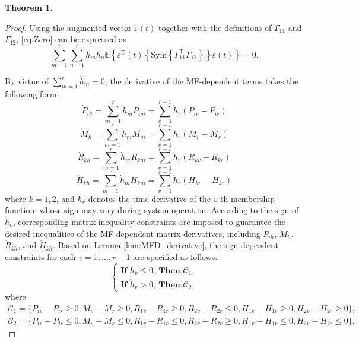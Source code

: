 \documentclass[preprint,review,fleqn,sort&compress,3p]{elsarticle}
\theoremstyle{definition} %
\theoremstyle{definition}%
\newtheorem{thm}{Theorem}[section]
\begin{document}
\begin{thm}
\begin{proof}
Using the augmented vector $\varepsilon(t)$ together with the definitions of $\Gamma_{11}$ and $\Gamma_{12}$, \eqref{eq:Zero} can be expressed as
\begin{equation} \label{eq:compact_VEQ}
	\sum_{m=1}^{r} \sum_{n=1}^{r} h_m h_n
	\mathbb{E} \left\lbrace 
	\varepsilon^{\mathrm{T}}(t) 
	\left\lbrace 
	\mathrm{Sym} \left\{ 
	\Gamma_{11}^{\mathrm{T}} \Gamma_{12}
	\right\} 
	\right\rbrace 
	\varepsilon(t)
	\right\rbrace 
	= 0.
\end{equation}

By virtue of $\sum_{m=1}^{r}\dot{h}_m=0$, the derivative of the MF-dependent terms takes the following form:
\begin{equation}
\dot{P}_{ih} = \sum_{m=1}^{r} \dot{h}_m P_{im} = \sum_{v=1}^{r-1} \dot{h}_v (P_{iv} - P_{ir})
\end{equation}
\begin{equation}
	\dot{M}_{h} = \sum_{m=1}^{r} \dot{h}_m M_{m} = \sum_{v=1}^{r-1} \dot{h}_v (M_{v} - M_{r})
\end{equation}
\begin{equation}
	\dot{R}_{kh} = \sum_{m=1}^{r} \dot{h}_m R_{km} = \sum_{v=1}^{r-1} \dot{h}_v (R_{kv} - R_{kr})
\end{equation}
\begin{equation}
	\dot{H}_{kh} = \sum_{m=1}^{r} \dot{h}_m H_{km} = \sum_{v=1}^{r-1} \dot{h}_v (H_{kv} - H_{kr})
\end{equation}
where $k = 1, 2$, and $\dot{h}_v$ denotes the time derivative of the $v$-th membership function, whose sign may vary during system operation. According to the sign of $\dot{h}_v$, corresponding matrix inequality constraints are imposed to guarantee the desired inequalities of the MF-dependent matrix derivatives, including $\dot P_{ih}$, $\dot M_h$, $\dot R_{kh}$, and $\dot H_{kh}$. Based on Lemma \ref{lem:MFD_derivative}, the sign-dependent constraints for each $v=1,\ldots,r-1$ are specified as follows:
\begin{equation}
	\begin{cases}
		\textbf{If } \dot{h}_v \le 0,\ \textbf{Then } \mathcal{C}_1, \\[6pt]
		\textbf{If } \dot{h}_v > 0,\ \textbf{Then } \mathcal{C}_2.
	\end{cases}
\end{equation}
where 
\begin{align*}
	\mathcal{C}_1=\{P_{iv}-P_{ir} \ge 0, M_{v}-M_{r} \ge 0, 
	R_{1v}-R_{1r} \ge 0,
	R_{2v}-R_{2r} \leq 0,
	H_{1v}-H_{1r} \ge 0, 
	H_{2v}-H_{2r} \ge  0\},
\end{align*}
\begin{align*}
	\mathcal{C}_2=\{P_{iv}-P_{ir} \le 0, M_{v}-M_{r} \le 0, 
	R_{1v}-R_{1r} \le 0, 
	R_{2v}-R_{2r} \ge 0, 
	H_{1v}-H_{1r} \le 0, 
	H_{2v}-H_{2r} \le 0\}.
\end{align*}


\end{proof}
\end{thm}
\end{document}
